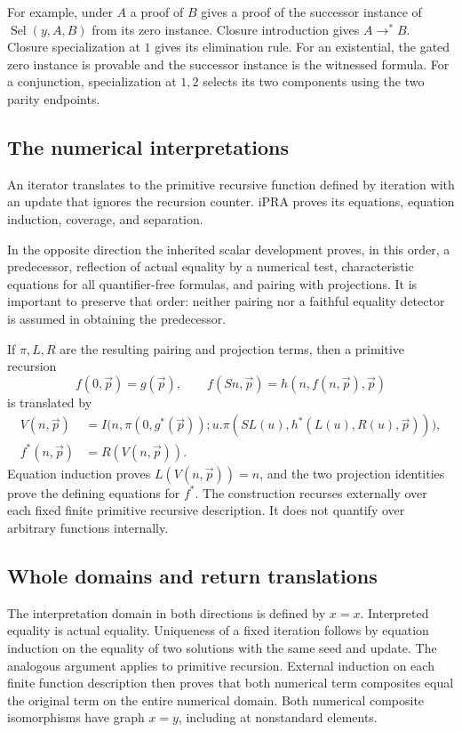 For example, under $A$ a proof of $B$ gives a proof of the successor
instance of $\operatorname{Sel}(y,A,B)$ from its zero instance.
Closure introduction gives $A\to^*B$.  Closure specialization at $1$
gives its elimination rule.  For an existential, the gated zero instance
is provable and the successor instance is the witnessed formula.
For a conjunction, specialization at $1,2$ selects its two components
using the two parity endpoints.

\subsection{The numerical interpretations}

An iterator translates to the primitive recursive function defined by
iteration with an update that ignores the recursion counter.  iPRA proves
its equations, equation induction, coverage, and separation.

In the opposite direction the inherited scalar development proves, in
this order, a predecessor, reflection of actual equality by a numerical
test, characteristic equations for all quantifier-free formulas, and
pairing with projections.  It is important to preserve that order:
neither pairing nor a faithful equality detector is assumed in obtaining
the predecessor.

If $\pi,L,R$ are the resulting pairing and projection terms, then a
primitive recursion
\[
 f(0,\vec p)=g(\vec p),\qquad
 f(Sn,\vec p)=h(n,f(n,\vec p),\vec p)
\]
is translated by
\[
\begin{aligned}
 V(n,\vec p)&=
 I\bigl(n,\pi(0,g^*(\vec p));
      u.\pi(SL(u),h^*(L(u),R(u),\vec p))\bigr),\\
 f^*(n,\vec p)&=R(V(n,\vec p)).
\end{aligned}
\]
Equation induction proves $L(V(n,\vec p))=n$, and the two projection
identities prove the defining equations for $f^*$.  The construction
recurses externally over each fixed finite primitive recursive
description.  It does not quantify over arbitrary functions internally.

\subsection{Whole domains and return translations}

The interpretation domain in both directions is defined by $x=x$.
Interpreted equality is actual equality.  Uniqueness of a fixed iteration
follows by equation induction on the equality of two solutions with the
same seed and update.  The analogous argument applies to primitive
recursion.  External induction on each finite function description then
proves that both numerical term composites equal the original term on
the entire numerical domain.  Both numerical composite isomorphisms have
graph $x=y$, including at nonstandard elements.

